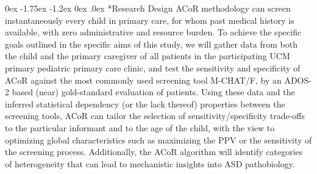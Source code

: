 \documentclass[onecolumn, compsoc,11pt]{IEEEtran}
\makeatletter
\renewcommand\subsection{\@startsection {subsection}{2}{\z@}%
                                   {0ex \@plus -1.75ex \@minus -1.2ex}%
                                   {0ex \@plus.0ex}%
                                   {\fontsize{11}{11}\selectfont\bfseries\sffamily\color{black}}}
\renewcommand{\captionN}[1]{\caption{\color{CadetBlue4!80!black} \sffamily \fontsize{9}{10}\selectfont #1  }}
\def\ZERO{ACoR\xspace}
\makeatother
\begin{document}




\subsection*{Research Design} %
\ZERO methodology can  screen instantaneously   every child  in primary care, for whom past medical history is available, with zero administrative and resource burden. To achieve the specific goals outlined in the specific aims of this study, we will gather data from both the child and the primary caregiver of all patients in the participating UCM primary pediatric primary care clinic, and test the sensitivity and specificity of \ZERO against the most commonly used screening tool M-CHAT/F, by an ADOS-2 based  (near) gold-standard evaluation of   patients. Using these data and the inferred statistical dependency (or the lack thereof) properties between the screening tools, \ZERO  can tailor the selection of sensitivity/specificity trade-offs  to the particular informant and to the age of the child, with the view to optimizing global characteristics such as maximizing the PPV or the sensitivity of the screening process. Additionally, the \ZERO algorithm will identify categories of heterogeneity that can lead to mechanistic insights into ASD pathobiology.
\end{document}
